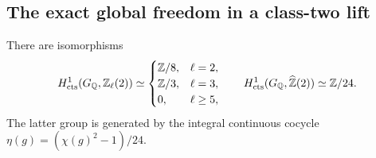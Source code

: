 \subsection{The exact global freedom in a class-two lift}
\label{sec:ghost-h1-weight2}

\begin{proposition}
\label{prop:ghost-h1-weight2}
There are isomorphisms
\[
 H^1_{\rm cts}(G_{\mathbb Q},\mathbb Z_\ell(2))
 \simeq
 \begin{cases}
  \mathbb Z/8,&\ell=2,\\
  \mathbb Z/3,&\ell=3,\\
  0,&\ell\ge5,
 \end{cases}
 \qquad
 H^1_{\rm cts}(G_{\mathbb Q},\widehat{\mathbb Z}(2))
       \simeq\mathbb Z/24.
\]
The latter group is generated by the integral continuous
cocycle \(\eta(g)=(\chi(g)^2-1)/24\).
\end{proposition}
